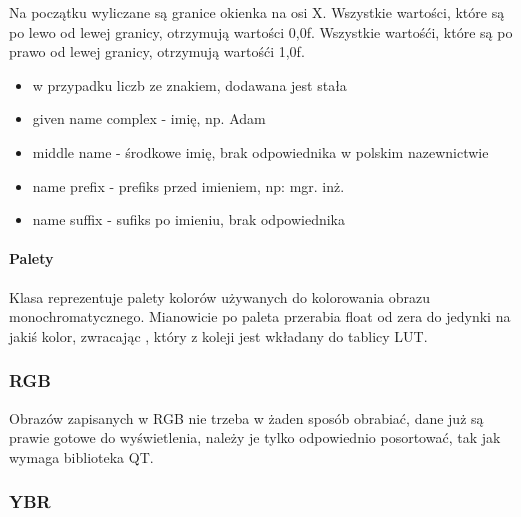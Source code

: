Na początku wyliczane są granice okienka na osi X.
Wszystkie wartości, które są po lewo od lewej granicy, otrzymują wartości 0,0f.
Wszystkie wartośći, które są po prawo od lewej granicy, otrzymują wartośći 1,0f.

\begin{itemize}
    \item w przypadku liczb ze znakiem, dodawana jest stała 
    \item given name complex - imię, np. Adam
    \item middle name - środkowe imię, brak odpowiednika w polskim nazewnictwie
    \item name prefix - prefiks przed imieniem, np: mgr. inż.
    \item name suffix - sufiks po imieniu, brak odpowiednika
\end{itemize}


\paragraph{Palety} 
Klasa  reprezentuje palety kolorów używanych do kolorowania obrazu monochromatycznego.
Mianowicie po paleta przerabia float od zera do jedynki na jakiś kolor, zwracając , który z koleji jest wkładany do tablicy LUT.

\subsubsection{RGB}

Obrazów zapisanych w RGB nie trzeba w żaden sposób obrabiać, dane już są prawie gotowe do wyświetlenia, należy je tylko odpowiednio posortować, tak jak wymaga biblioteka QT.
\qtclass{}

\subsubsection{YBR}